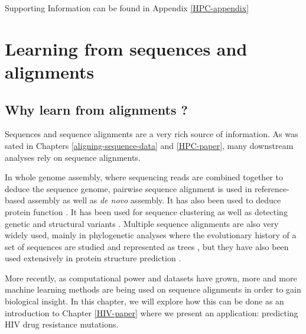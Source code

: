 \documentclass[
  11pt,
  twoside,
  BCOR=10mm,
  listof=totoc]{scrbook}
\begin{document}
Supporting Information can be found in Appendix \ref{HPC-appendix}


\hypertarget{learning-from-sequences-and-alignments}{%
\chapter{Learning from sequences and alignments}\label{learning-from-sequences-and-alignments}}

\hypertarget{why-learn-from-alignments}{%
\section{Why learn from alignments ?}\label{why-learn-from-alignments}}

Sequences and sequence alignments are a very rich source of information. As was sated in Chapters \ref{aligning-sequence-data} and \ref{HPC-paper}, many downstream analyses rely on sequence alignments.

In whole genome assembly, where sequencing reads are combined together to deduce the sequence genome, pairwise sequence alignment is used in reference-based assembly \autocite{martinNextgenerationTranscriptomeAssembly2011,kyriakidouCurrentStrategiesPolyploid2018} as well as \emph{de novo} \autocite{paszkiewiczNovoAssemblyShort2010,sohnPresentFutureNovo2018} assembly. It has also been used to deduce protein function \autocite{sleatorOverviewSilicoProtein2010}. It has been used for sequence clustering \autocite{sahlinNovoClusteringLongRead2020} as well as detecting genetic \autocite{koboldtBestPracticesVariant2020} and structural variants \autocite{alkanGenomeStructuralVariation2011,hoStructuralVariationSequencing2020}. Multiple sequence alignments are also very widely used, mainly in phylogenetic analyses where the evolutionary history of a set of sequences are studied and represented as trees \autocite{morrisonPhylogeneticTreebuilding1996,kapliPhylogeneticTreeBuilding2020}, but they have also been used extensively in protein structure prediction \autocite{kuhlmanAdvancesProteinStructure2019}.

More recently, as computational power and datasets have grown, more and more machine learning methods are being used on sequence alignments in order to gain biological insight. In this chapter, we will explore how this can be done as an introduction to Chapter \ref{HIV-paper} where we present an application: predicting HIV drug resistance mutations.
\end{document}
